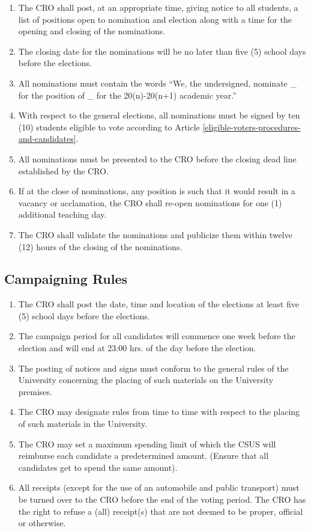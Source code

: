 \begin{enumerate}
\def\labelenumi{\arabic{enumi}.}
\item
  The CRO shall post, at an appropriate time, giving notice to all
  students, a list of positions open to nomination and election along
  with a time for the opening and closing of the nominations.
\item
  The closing date for the nominations will be no later than five (5)
  school days before the elections.
\item
  All nominations must contain the words ``We, the
  undersigned, nominate \_ for the position of \_ for the 20(n)-20(n+1)
  academic year.''
\item
  With respect to the general elections, all nominations must be signed
  by ten (10) students eligible to vote according to Article \ref{eligible-voters-procedures-and-candidates}.
\item
  All nominations must be presented to the CRO before the closing dead
  line established by the CRO.
\item
  If at the close of nominations, any position is such that it would
  result in a vacancy or acclamation, the CRO shall re-open nominations
  for one (1) additional teaching day.
\item
  The CRO shall validate the nominations and publicize them within
  twelve (12) hours of the closing of the nominations.
\end{enumerate}

\subsection{Campaigning Rules}\label{campaigning-rules}

\begin{enumerate}
\def\labelenumi{\arabic{enumi}.}
\item
  The CRO shall post the date, time and location of the elections at
  least five (5) school days before the elections.
\item
  The campaign period for all candidates will commence one week before
  the election and will end at 23:00 hrs. of the day before the
  election.
\item
  The posting of notices and signs must conform to the general rules of
  the University concerning the placing of such materials on the
  University premises.
\item
  The CRO may designate rules from time to time with respect to the
  placing of such materials in the University.
\item
  The CRO may set a maximum spending limit of which the CSUS will
  reimburse each candidate a predetermined amount. (Ensure that all
  candidates get to spend the same amount).
\item
  All receipts (except for the use of an automobile and public
  transport) must be turned over to the CRO before the end of the voting
  period. The CRO has the right to refuse a (all) receipt(s) that are
  not deemed to be proper, official or otherwise.
\end{enumerate}

